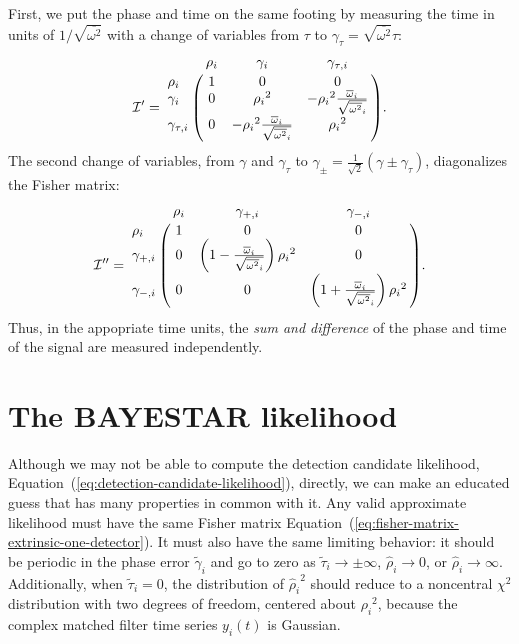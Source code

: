 \documentclass[amsmath,amssymb,aps,prx,reprint,nopreprintnumbers,nofootinbib]{revtex4-1}
\begin{document}
First, we put the phase and time on the same footing by measuring the time in units of $1 / \sqrt{\overline{\omega^2}}$ with a change of variables from $\tau$ to $\gamma_\tau = \sqrt{\overline{\omega^2}} \tau$:
%
\begin{equation}
    \mathcal{I}' = \bordermatrix{
        ~ & \rho_i & \gamma_i & \gamma_{\tau,i} \cr
        \rho_i & 1 & 0 & 0 \cr
        \gamma_i & 0 & {\rho_i}^2 & -{\rho_i}^2\frac{{\overline{\omega}}_i}{\sqrt{{\overline{\omega^2}}_i}} \cr
        \gamma_{\tau,i} & 0 & -{\rho_i}^2\frac{{\overline{\omega}}_i}{\sqrt{{\overline{\omega^2}}_i}} & {\rho_i}^2
    }.
\end{equation}
%
The second change of variables, from $\gamma$ and $\gamma_\tau$ to $\gamma_\pm = \frac{1}{\sqrt{2}}(\gamma \pm \gamma_\tau)$, diagonalizes the Fisher matrix:
%
\begin{equation}\label{eq:fisher-matrix-extrinsic-one-detector}
    \mathcal{I}'' = \bordermatrix{
        ~ & \rho_i & \gamma_{+,i} & \gamma_{-,i} \cr
        \rho_i & 1 & 0 & 0 \cr
        \gamma_{+,i} & 0 & \left(1 - \frac{\overline{\omega}_i}{\sqrt{\overline{\omega^2}_i}}\right){\rho_i}^2 & 0 \cr
        \gamma_{-,i} & 0 & 0 & \left(1 + \frac{\overline{\omega}_i}{\sqrt{\overline{\omega^2}_i}}\right){\rho_i}^2
    }.
\end{equation}
%
Thus, in the appopriate time units, the \textit{sum and difference} of the phase and time of the signal are measured independently.

\section{The \ac{BAYESTAR} likelihood}

Although we may not be able to compute the detection candidate likelihood, Equation~(\ref{eq:detection-candidate-likelihood}), directly, we can make an educated guess that has many properties in common with it. Any valid approximate likelihood must have the same Fisher matrix Equation~(\ref{eq:fisher-matrix-extrinsic-one-detector}). It must also have the same limiting behavior: it should be periodic in the phase error $\tilde{\gamma}_i$ and go to zero as $\tilde{\tau}_i \rightarrow \pm \infty$, $\hat{\rho}_i \rightarrow 0$, or $\hat{\rho}_i \rightarrow \infty$. Additionally, when $\tilde{\tau}_i = 0$, the distribution of ${\hat{\rho}_i}^2$ should reduce to a noncentral $\chi^2$ distribution with two degrees of freedom, centered about ${\rho_i}^2$, because the complex matched filter time series $y_i(t)$ is Gaussian.
\end{document}
